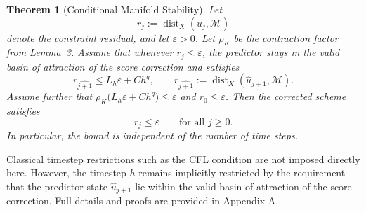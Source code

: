 \documentclass[letterpaper]{article} %
\newtheorem{lemma}{Lemma}
\newtheorem{theorem}{Theorem}
\begin{document}
\begin{theorem}[Conditional Manifold Stability]
Let
\[
r_j:=\operatorname{dist}_X(u_j,\mathcal{M})
\]
denote the constraint residual, and let $\varepsilon>0$. Let $\rho_K$ be
the contraction factor from Lemma~3. Assume that whenever
$r_j\le\varepsilon$, the predictor stays in the valid basin of attraction
of the score correction and satisfies
\[
r_{\widehat{j+1}}
\le L_h\varepsilon+Ch^q,
\qquad
r_{\widehat{j+1}}
:=
\operatorname{dist}_X(\widehat{u}_{j+1},\mathcal{M}).
\]
Assume further that
$
\rho_K\bigl(L_h\varepsilon+Ch^q\bigr)\le\varepsilon
$
and $r_0\le\varepsilon$. Then the corrected scheme satisfies
\[
r_j\le\varepsilon
\qquad\text{for all } j\ge0.
\]
In particular, the bound is independent of the number of time steps.
\end{theorem}

Classical timestep restrictions such as the CFL condition are not imposed directly here. However, the timestep $h$ remains implicitly restricted by the requirement that the predictor state $\widehat{u}_{j+1}$ lie within the valid basin of attraction of the score correction. Full details and proofs are provided in Appendix A.





\end{document}
